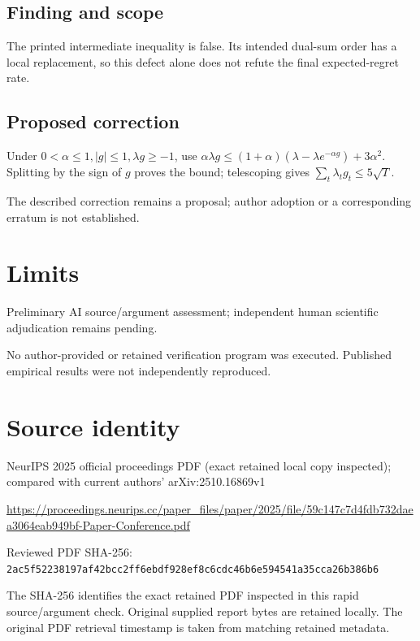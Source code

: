 \documentclass[11pt]{article}
\begin{document}
\subsection*{Finding and scope}

The printed intermediate inequality is false. Its intended dual-sum order has a local replacement, so this defect alone does not refute the final expected-regret rate.

\subsection*{Proposed correction}

Under \(0<\alpha\leq1,|g|\leq1,\lambda g\geq-1\), use \(\alpha\lambda g\leq(1+\alpha)(\lambda-\lambda e^{-\alpha g})+3\alpha^2\). Splitting by the sign of \(g\) proves the bound; telescoping gives \(\sum_t\lambda_tg_t\leq5\sqrt T\).

The described correction remains a proposal; author adoption or a corresponding erratum is not established.

\section*{Limits}

Preliminary AI source/argument assessment; independent human scientific adjudication remains pending.\par

No author-provided or retained verification program was executed. Published empirical results were not independently reproduced.\par

\section*{Source identity}

NeurIPS 2025 official proceedings PDF (exact retained local copy inspected); compared with current authors’ arXiv:2510.16869v1

\url{https://proceedings.neurips.cc/paper_files/paper/2025/file/59c147c7d4fdb732daea3064eab949bf-Paper-Conference.pdf}

Reviewed PDF SHA-256: \nolinkurl{2ac5f52238197af42bcc2ff6ebdf928ef8c6cdc46b6e594541a35cca26b386b6}

The SHA-256 identifies the exact retained PDF inspected in this rapid source/argument check. Original supplied report bytes are retained locally. The original PDF retrieval timestamp is taken from matching retained metadata.
\end{document}
